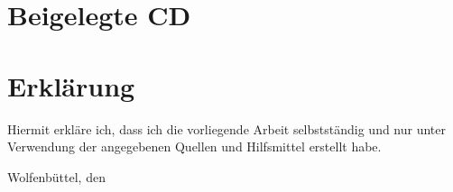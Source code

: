 \documentclass[
  a4paper,					    %
  twoside,
  DIV=calc,     				%
  bibliography=totoc,
  cleardoublepage=empty,
  ngerman,     					%
  final       					%
]{scrbook}
\begin{document}









\backmatter



\chapter{Beigelegte CD}
\label{sec:BeigelegteCD}


\chapter{Erklärung}
\label{sec:Erklärung}
Hiermit erkläre ich, dass ich die vorliegende Arbeit selbstständig und nur unter Verwendung der angegebenen Quellen und Hilfsmittel erstellt habe.
\vspace{2.5cm} \par
Wolfenbüttel, den %


\glsaddall
\printglossaries


%
\nocite{*}
%
\begin{singlespace}

\end{singlespace}
\end{document}
